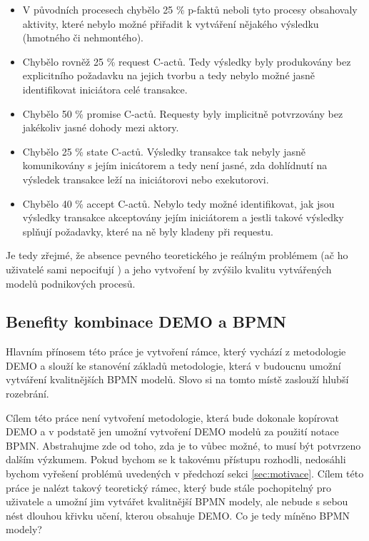 \documentclass[]{article}
\begin{document}
\begin{itemize}
\item V původních procesech chybělo 25 \% p-faktů neboli tyto procesy obsahovaly aktivity, které nebylo možné přiřadit k vytváření nějakého výsledku (hmotného či nehmontého).
\item Chybělo rovněž 25 \% request C-actů. Tedy výsledky byly produkovány bez explicitního požadavku na jejich tvorbu a tedy nebylo možné jasně identifikovat iniciátora celé transakce.
\item Chybělo 50 \% promise C-actů. Requesty byly implicitně potvrzovány bez jakékoliv jasné dohody mezi aktory.
\item Chybělo 25 \% state C-actů. Výsledky transakce tak nebyly jasně komunikovány s jejím inicátorem a tedy není jasné, zda dohlídnutí na výsledek transakce leží na iniciátorovi nebo exekutorovi.
\item Chybělo 40 \% accept C-actů. Nebylo tedy možné identifikovat, jak jsou výsledky transakce akceptovány jejím iniciátorem a jestli takové výsledky splňují požadavky, které na ně byly kladeny při requestu.
\end{itemize}

Je tedy zřejmé, že absence pevného teoretického je reálným problémem (ač ho uživatelé sami nepociťují \cite{VanNuffel2009}) a jeho vytvoření by zvýšilo kvalitu vytvářených modelů podnikových procesů.

\subsection{Benefity kombinace DEMO a BPMN}
Hlavním přínosem této práce je vytvoření rámce, který vychází z metodologie DEMO a slouží ke stanovéní základů metodologie, která v budoucnu umožní vytváření kvalitnějších BPMN modelů. Slovo  si na tomto místě zaslouží hlubší rozebrání.

Cílem této práce není vytvoření metodologie, která bude dokonale kopírovat DEMO a v podstatě jen umožní vytvoření DEMO modelů za použití notace BPMN. Abstrahujme zde od toho, zda je to vůbec možné, to musí být potvrzeno dalším výzkumem. Pokud bychom se k takovému přístupu rozhodli, nedosáhli bychom vyřešení problémů uvedených v předchozí sekci \ref{sec:motivace}. Cílem této práce je nalézt takový teoretický rámec, který bude stále pochopitelný pro uživatele a umožní jim vytvářet kvalitnější BPMN modely, ale nebude s sebou nést dlouhou křivku učení, kterou obsahuje DEMO. Co je tedy míněno  BPMN modely?
\end{document}
